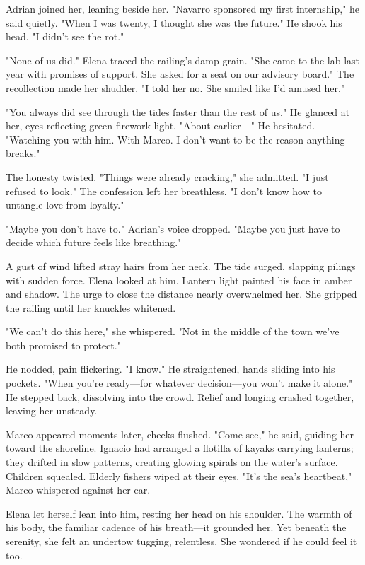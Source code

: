 Adrian joined her, leaning beside her. "Navarro sponsored my first internship," he said quietly. "When I was twenty, I thought she was the future." He shook his head. "I didn't see the rot."

"None of us did." Elena traced the railing's damp grain. "She came to the lab last year with promises of support. She asked for a seat on our advisory board." The recollection made her shudder. "I told her no. She smiled like I'd amused her."

"You always did see through the tides faster than the rest of us." He glanced at her, eyes reflecting green firework light. "About earlier—" He hesitated. "Watching you with him. With Marco. I don't want to be the reason anything breaks."

The honesty twisted. "Things were already cracking," she admitted. "I just refused to look." The confession left her breathless. "I don't know how to untangle love from loyalty."

"Maybe you don't have to." Adrian's voice dropped. "Maybe you just have to decide which future feels like breathing."

A gust of wind lifted stray hairs from her neck. The tide surged, slapping pilings with sudden force. Elena looked at him. Lantern light painted his face in amber and shadow. The urge to close the distance nearly overwhelmed her. She gripped the railing until her knuckles whitened.

"We can't do this here," she whispered. "Not in the middle of the town we've both promised to protect."

He nodded, pain flickering. "I know." He straightened, hands sliding into his pockets. "When you're ready—for whatever decision—you won't make it alone." He stepped back, dissolving into the crowd. Relief and longing crashed together, leaving her unsteady.

Marco appeared moments later, cheeks flushed. "Come see," he said, guiding her toward the shoreline. Ignacio had arranged a flotilla of kayaks carrying lanterns; they drifted in slow patterns, creating glowing spirals on the water's surface. Children squealed. Elderly fishers wiped at their eyes. "It's the sea's heartbeat," Marco whispered against her ear.

Elena let herself lean into him, resting her head on his shoulder. The warmth of his body, the familiar cadence of his breath—it grounded her. Yet beneath the serenity, she felt an undertow tugging, relentless. She wondered if he could feel it too.


